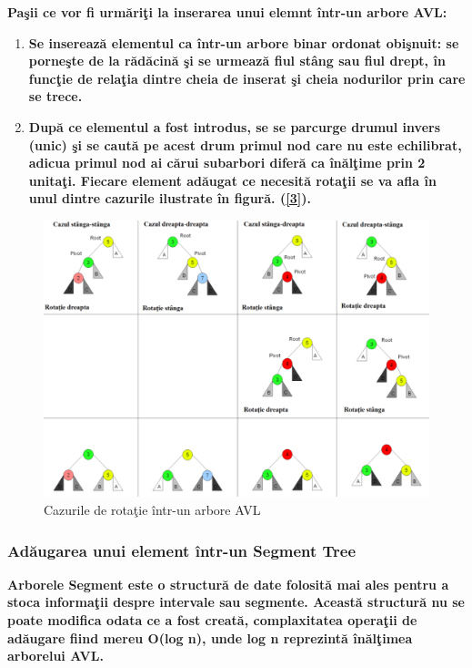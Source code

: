 \documentclass[12pt]{article}
\begin{document}
\textbf{\hspace{2mm}Pa\c{s}ii ce vor fi urm\u{a}ri\c{t}i la inserarea unui elemnt \^{i}ntr-un arbore AVL:}
\begin{enumerate}

\item{\textbf{Se insereaz\u{a} elementul ca \^{i}ntr-un arbore binar ordonat obi\c{s}nuit: se porne\c{s}te de la r\u{a}d\u{a}cin\u{a} \c{s}i se urmeaz\u{a} fiul st\^{a}ng sau fiul drept, \^{i}n func\c{t}ie de rela\c{t}ia dintre cheia de inserat \c{s}i cheia nodurilor prin care se trece.}}

\item{\textbf{Dup\u{a} ce elementul a fost introdus, se se parcurge drumul invers (unic) \c{s}i se caut\u{a} pe acest drum primul nod care nu este echilibrat, adicu{a} primul nod ai c\u{a}rui subarbori difer\u{a} ca \^{i}n\u{a}l\c{t}ime prin 2 unita\c{t}i. Fiecare element ad\u{a}ugat ce necesit\u{a} rota\c{t}ii se va afla \^{i}n unul dintre cazurile ilustrate \^{i}n figur\u{a}. (\hyperlink{page.14}{[3]}).}}

\end{enumerate}
\begin{figure}[H]
\includegraphics[scale = 0.5]{Rotate.png}
\caption{Cazurile de rota\c{t}ie \^{i}ntr-un arbore AVL}
\label{fig:rotate}
\end{figure}

\subsubsection{Ad\u{a}ugarea unui element \^{i}ntr-un Segment Tree}
\textbf{\hspace{7mm} Arborele Segment este o structur\u{a} de date folosit\u{a} mai ales pentru a stoca informa\c{t}ii despre intervale sau segmente. Aceast\u{a} structur\u{a} nu se poate modifica odata ce a fost creat\u{a}, complaxitatea opera\c{t}ii de ad\u{a}ugare fiind mereu O(log n), unde log n reprezint\u{a} \^{i}n\u{a}l\c{t}imea arborelui AVL. }
\end{document}
